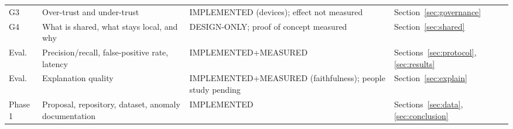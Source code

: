 \begin{table}[!t]
\begin{tabularx}{\textwidth}{@{}L{0.07\textwidth} L{0.30\textwidth} L{0.24\textwidth} Y@{}}
G3 & Over-trust and under-trust & IMPLEMENTED (devices); effect not measured & Section~\ref{sec:governance} \\
G4 & What is shared, what stays local, and why & DESIGN-ONLY; proof of concept measured & Section~\ref{sec:shared} \\
Eval. & Precision/recall, false-positive rate, latency & IMPLEMENTED+MEASURED & Sections~\ref{sec:protocol}, \ref{sec:results} \\
Eval. & Explanation quality & IMPLEMENTED+MEASURED (faithfulness); people study pending & Section~\ref{sec:explain} \\
Phase 1 & Proposal, repository, dataset, anomaly documentation & IMPLEMENTED & Sections~\ref{sec:data}, \ref{sec:conclusion} \\
\bottomrule
\end{tabularx}
\end{table}
